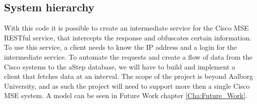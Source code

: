 \subsection{System hierarchy}
With this code it is possible to create an intermediate service for the Cisco MSE RESTful service, that intercepts the response and obfuscates certain information. To use this service, a client needs to know the IP address and a login for the intermediate service. To automate the requests and create a flow of data from the Cisco systems to the aStep database, we will have to build and implement a client that fetches data at an interval. The scope of the project is beyond Aalborg University, and as such the project will need to support more then a single Cisco MSE system. A model can be seen in Future Work chapter \ref{Cha:Future_Work}. 